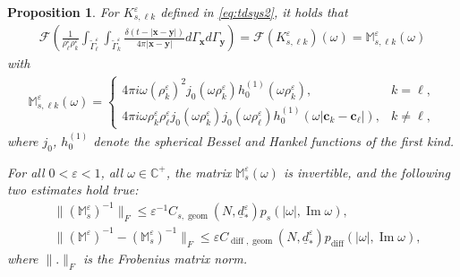 \documentclass[]{article}
\newtheorem{proposition}{Proposition}
\numberwithin{equation}{section}
\numberwithin{theorem}{section}
\numberwithin{lemma}{section}
\numberwithin{corollary}{section}
\numberwithin{proposition}{section}
\numberwithin{definition}{section}
\newcommand{\bc}{\boldsymbol{c}}
\newcommand{\re}{\varepsilon}
\renewcommand{\vec}{\boldsymbol}
\renewcommand{\Im}{\operatorname{Im}}
\begin{document}
	\begin{proposition}
		\label{prop:difM1}
		For $K^{\re}_{s,\ell k}$ defined in \eqref{eq:tdsys2}, it holds that 
		\begin{align}
			\label{eq:fm}
			\mathcal{F}\left(\frac{1}{\rho_{\ell}^{\re}\rho_k^{\re}}\int_{\widetilde{\Gamma}_{\ell}^{\re}}\int_{\widetilde{\Gamma}_{k}^{\re}}\frac{\delta(t-|\vec{x}-\vec{y}|)}{4\pi|\vec{x}-\vec{y}|}d\Gamma_{\vec{x}}d\Gamma_{\vec{y}}\right)=\mathcal{F}\left(K^{\re}_{s,\ell k}\right)(\omega)= \mathbb{M}_{s, \ell k}^{\re}(\omega)
		\end{align}
		with
		\begin{align}
			\label{eq:M_simplified}
			\mathbb{M}^{\re}_{s, \ell k}(\omega) = 
			\left\{
			\begin{array}{ll}
				4 \pi i \omega (\rho^{\re}_k)^2 j_0(\omega \rho^{\re}_k) h^{(1)}_0(\omega \rho^{\re}_k), &k = \ell, \\
				4 \pi i \omega \rho^{\re}_k \rho^{\re}_{\ell} j_0(\omega \rho^{\re}_k) j_0(\omega \rho^{\re}_{\ell}) h^{(1)}_0(\omega |\bc_k - \bc_{\ell}| ), &k \neq \ell,
			\end{array}
			\right.
		\end{align}
		where $j_0$, $h^{(1)}_0$ denote the spherical Bessel and Hankel functions of the first kind. 
		
		For all  $0<\re<1$, all $\omega\in \mathbb{C}^+$, the matrix $\mathbb{M}^{\re}_s (\omega)$ is invertible, and the following two estimates hold true: 
		\begin{align}
			\label{eq:widm}
			&\|(\mathbb{M}^{\re}_s)^{-1}\|_{F} \leq \varepsilon^{-1} C_{s, \operatorname{geom}}( N,{\underline{d}}^{\re}_*)p_s(|\omega|,\Im \omega),\\
			\label{eq:widm2}
			&\|\left(\mathbb{M}^{\varepsilon}\right)^{-1}-(\mathbb{M}^{\re}_s)^{-1}\|_{F} \leq \varepsilon {C}_{\operatorname{diff}, \operatorname{geom}}( N,\underline{{d}}_*^{\re}){p}_{\operatorname{diff}}(|\omega|,\Im \omega),
		\end{align}
		where $\|.\|_F$ is the Frobenius matrix norm. 
	\end{proposition}
\end{document}

